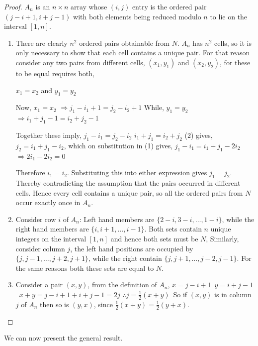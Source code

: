 \documentclass[
  11pt,
  a4paper]{book}
\begin{document}
\begin{proof}
$A_n$ is an $n \times n$ array whose $(i, j)$ entry is the
ordered pair $(j - i + 1, i + j - 1)$ with both elements being
reduced modulo $n$ to lie on the interval $[1, n]$.
\begin{enumerate}
  \item{There are clearly $n^2$ ordered pairs obtainable from
     $N$. $A_n$ has $n^2$ cells, so it is only necessary to
     show that each cell contains a unique pair. For that
     reason consider any two pairs from different cells,
     $(x_1, y_1)$ and $(x_2, y_2)$, for these to be equal
     requires both,

     $x_1 = x_2$ and $y_1 = y_2$

     Now, $x_1 = x_2$ $\Rightarrow j_1-i_1 + 1 = j_2-i_2+1$
     While, $y_1 = y_2$ $\Rightarrow i_1 + j_1 - 1 = i_2 + j_2 - 1$

     Together these imply,
     $j_1 - i_1 = j_2 - i_2 $
     $i_1 + j_1 = i_2 + j_2 $
     (2) gives, $j_2 = i_1 + j_1 - i_2$, which on substitution
     in (1) gives, $j_1 - i_1 = i_1 + j_1 - 2i_2$
     $\Rightarrow 2i_1 - 2i_2 = 0$
     
     Therefore $i_1 = i_2$.
     Substituting this into either expression gives
     $j_1 = j_2$.
     Thereby
     contradicting the assumption that the pairs occurred
     in different cells. Hence every cell contains a unique
     pair, so all the ordered pairs from $N$ occur exactly
     once in $A_n$.}
  \item{Consider row $i$ of $A_n$:
     Left hand members are $\{2-i, 3-i, \ldots, 1-i\}$, while
     the right hand members are $\{i, i + 1, \ldots, i - 1\}$.
     Both sets
     contain $n$ unique integers on the interval $[1,n]$
     and hence both sets must be $N$, Similarly, consider
     column $j$, the left hand positions are occupied by
     $\{j, j - 1, \ldots, j + 2, j + 1\}$, while the right
     contain $\{j, j + 1, \ldots, j - 2, j - 1\}$.
     For the same reasons both these sets are equal to $N$.}
  \item{Consider a pair $(x,y)$, from the definition of $A_n$,
     $x=j-i+1$\ $y=i+j-1$\ $x+y=j-i+1+i+j-1=2j$
     $\therefore j= \frac{1}{2} (x+y)$\ So if $(x,y)$ is in
     column $j$ of $A_n$ then so is $(y,x)$, since
     $\frac{1}{2}(x+y)=\frac{1}{2}(y+x)$.}
\end{enumerate}
\end{proof}

We can now present the general result.
\end{document}
